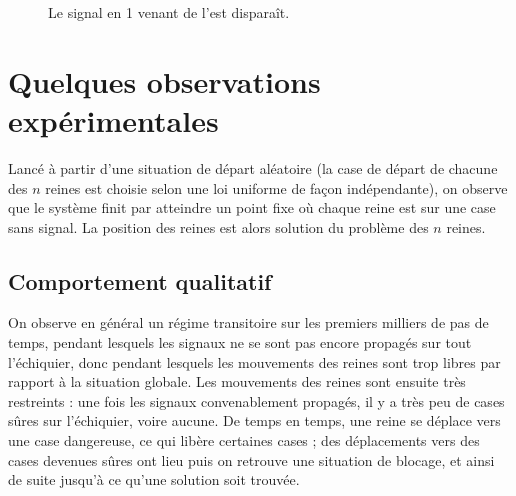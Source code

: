 \documentclass[11pt, openany]{article}
\begin{document}
\begin{figure}[p]
\centering
{}
\caption{Le signal en 1 venant de l'est disparaît.}
\end{figure}

\clearpage




\section*{Quelques observations expérimentales}


Lancé à partir d'une situation de départ aléatoire (la case de départ de chacune des $n$ reines est choisie selon une loi uniforme de façon indépendante), on observe que le système finit par atteindre un point fixe où chaque reine est sur une case sans signal. La position des reines est alors solution du problème des $n$ reines.

\subsection*{Comportement qualitatif}

On observe en général un régime transitoire sur les premiers milliers de pas de temps, pendant lesquels les signaux ne se sont pas encore propagés sur tout l'échiquier, donc pendant lesquels les mouvements des reines sont trop libres par rapport à la situation globale. Les mouvements des reines sont ensuite très restreints : une fois les signaux convenablement propagés, il y a très peu de cases sûres sur l'échiquier, voire aucune. De temps en temps, une reine se déplace vers une case dangereuse, ce qui libère certaines cases ; des déplacements vers des cases devenues sûres ont lieu puis on retrouve une situation de blocage, et ainsi de suite jusqu'à ce qu'une solution soit trouvée.
\end{document}
